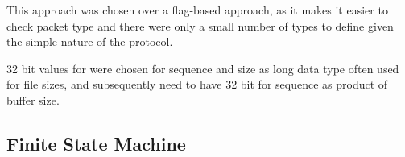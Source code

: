 \documentclass[12pt]{article}
\begin{document}
This approach was chosen over a flag-based approach, as it makes it easier to check packet type and there were only a small number of types to define given the simple nature of the protocol.

32 bit values for were chosen for sequence and size as long data type often used for file sizes, and subsequently need to have 32 bit for sequence as product of buffer size. 

\subsection{Finite State Machine}




\end{document}
